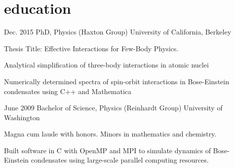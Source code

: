 \documentclass[]{friggeri-cv} %
\let\tempone\itemize
\let\temptwo\enditemize
\renewenvironment{itemize}{\tempone\addtolength{\itemsep}{0.5em}}{\temptwo}
\begin{document}
\vspace{-\baselineskip}
\section{education}

\begin{entrylist}
\entry
{Dec. 2015}
{PhD, {\normalfont  Physics (Haxton Group)}}
{University of California, Berkeley}
{Thesis Title: Effective Interactions for Few-Body Physics. 
\begin{itemize}
\item Analytical simplification of three-body interactions in atomic nuclei 
\item Numerically determined spectra of spin-orbit interactions in Bose-Einstein condensates using C++ and Mathematica
\end{itemize}}
\entry
{June 2009}
{Bachelor of Science, {\normalfont Physics (Reinhardt Group)}}
{University of Washington}
{Magna cum laude with honors. Minors in mathematics and chemistry. 
\begin{itemize}
\item Built software in C with OpenMP and MPI to simulate dynamics of Bose-Einstein condensates using large-scale parallel computing resources.
\end{itemize}}
\end{entrylist}




\end{document}
